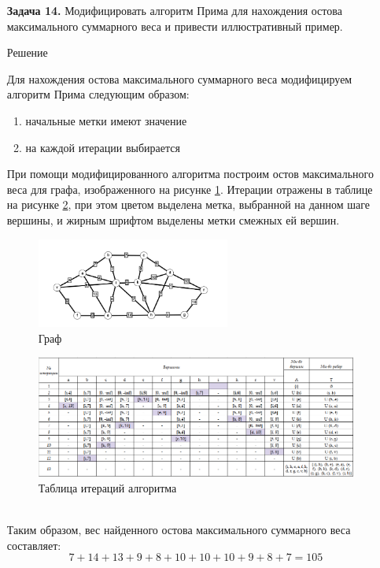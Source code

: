 \documentclass{article}
\begin{document}
\clearpage%
\begin{enumerate}
\item[\textbf{Задача 14.}]Модифицировать алгоритм Прима для нахождения остова максимального суммарного веса и привести иллюстративный пример.
\\
\begin{center}
Решение 
\end{center}
Для нахождения остова максимального суммарного веса модифицируем алгоритм Прима следующим образом:
\begin{enumerate}
    \item начальные метки имеют значение
    \item на каждой итерации выбирается
\end{enumerate}
При помощи модифицированного алгоритма построим остов максимального веса для графа, изображенного на рисунке \ref{fig:14_graph}. Итерации отражены в таблице на рисунке \ref{fig:14_matrix}, при этом цветом выделена метка, выбранной на данном шаге вершины, и жирным шрифтом выделены метки смежных ей вершин.  
\begin{figure}[ht]
    \centering
    \includegraphics[width=0.6\textwidth, center]{attachments/8/0.png}
    \caption{Граф}
    \label{fig:14_graph}
\end{figure}
\begin{figure}[ht]
    \centering
    \includegraphics[width=\textwidth, center]{attachments/14/matrix.png}
    \caption{Таблица итераций алгоритма}
    \label{fig:14_matrix}
\end{figure}
\\
Таким образом, вес найденного остова максимального суммарного веса составляет:
$$7+14+13+9+8+10+10+10+9+8+7 = 105$$
\end{enumerate}
\end{document}
